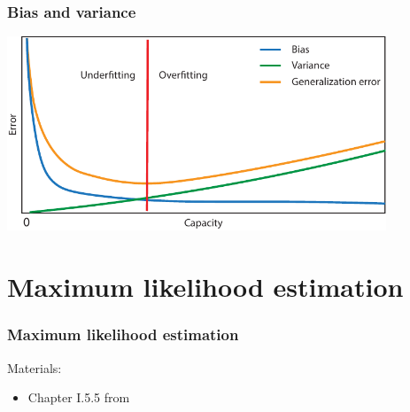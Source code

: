 \documentclass[notes]{beamer}          %
\newif\iffull
\begin{document}
\begin{frame}
\frametitle{Bias and variance}
    \begin{center}
        \includegraphics[width=0.85\textwidth]{../figures/week_1/bias_variance.pdf}
    \end{center}
\end{frame}

\iffull
\begin{frame}
\frametitle{Consistency}
    \begin{itemize}
        \item So far we considered fixed size of the training data sets.
        \item We expect that as the number $m$ of training examples grows the estimators will converge to the true value of the parameters.
        \item More formally this is captured in the notion of {\bf consistency}
        $$
        \mbox{plim}_{m \rightarrow \infty} \hat{\theta}_m = \theta
        $$
        where $ \mbox{plim}$ denotes convergence in probability: for any $\epsilon > 0$, $P(\mid \hat{\theta}_m - \theta \mid > \epsilon) \rightarrow 0$ as $m \rightarrow \infty$.
        \item For consistent models the bias decreases as $m$ increases, however a decreasing bias (when $m$ increases) does not imply consistency.
    \end{itemize}
\end{frame}
\fi

\iffull %

\section{Maximum likelihood estimation}

\begin{frame}
\frametitle{Maximum likelihood estimation}
Materials:
\begin{itemize}
    \item Chapter I.5.5 from \cite{deeplearning}
\end{itemize}
\end{frame}
\end{document}
